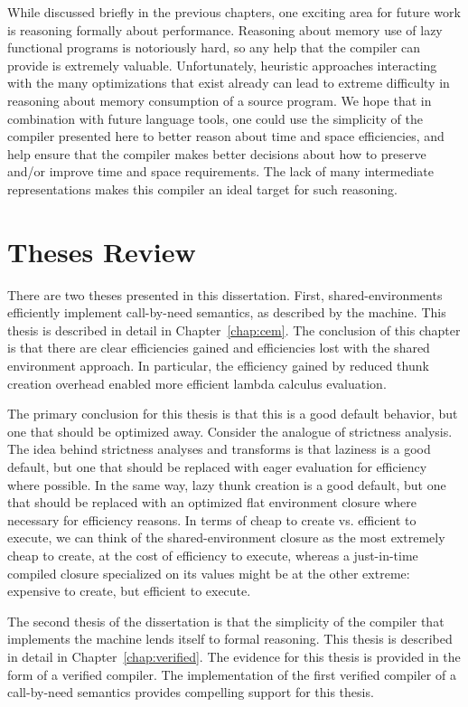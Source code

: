 While discussed briefly in the previous chapters, one exciting area for future
work is reasoning formally about performance. Reasoning about memory use of lazy
functional programs is notoriously hard, so any help that the compiler can
provide is extremely valuable. Unfortunately, heuristic approaches interacting
with the many optimizations that exist already can lead to extreme difficulty in
reasoning about memory consumption of a source program. We hope that in
combination with future language tools, one could use the simplicity of the
compiler presented here to better reason about time and space efficiencies, and
help ensure that the compiler makes better decisions about how to preserve
and/or improve time and space requirements. The lack of many intermediate
representations makes this compiler an ideal target for such reasoning.

\section{Theses Review}

There are two theses presented in this dissertation. First, shared-environments
efficiently implement call-by-need semantics, as described by the \ce machine.
This thesis is described in detail in Chapter~\ref{chap:cem}. The conclusion of
this chapter is that there are clear efficiencies gained and efficiencies lost
with the shared environment approach. In particular, the efficiency gained by
reduced thunk creation overhead enabled more efficient lambda calculus
evaluation. 

The primary conclusion for this thesis is that this is a good default behavior,
but one that should be optimized away. Consider the analogue of strictness
analysis. The idea behind strictness analyses and transforms is that laziness is
a good default, but one that should be replaced with eager evaluation for
efficiency where possible. In the same way, lazy thunk creation is a good
default, but one that should be replaced with an optimized flat environment
closure where necessary for efficiency reasons. In terms of cheap to create vs. 
efficient to execute, we can think of the shared-environment closure as the most
extremely cheap to create, at the cost of efficiency to execute, whereas a
just-in-time compiled closure specialized on its values might be at the other
extreme: expensive to create, but efficient to execute. 

The second thesis of the dissertation is that the simplicity of the compiler
that implements the \ce machine lends itself to formal reasoning. This thesis is
described in detail in Chapter~\ref{chap:verified}. The evidence for this thesis
is provided in the form of a verified compiler. The implementation of the first
verified compiler of a call-by-need semantics provides compelling support for
this thesis. 

